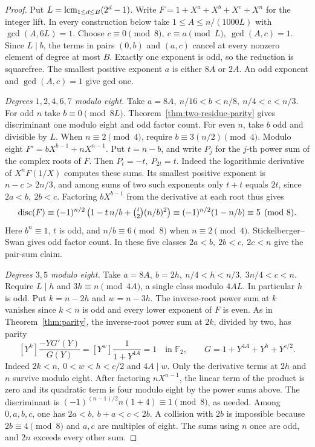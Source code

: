 \documentclass[11pt]{article}
\begin{document}
\begin{proof}
Put \(L=\mathop{\rm lcm}_{1\le d\le B}(2^d-1)\). Write
\(F=1+X^a+X^b+X^c+X^n\) for the integer lift. In every construction
below take \(1\le A\le n/(1000L)\) with \(\gcd(A,6L)=1\).
Choose \(c\equiv0\pmod8,\ c\equiv a\pmod L,\ \gcd(A,c)=1\).
Since \(L\mid b\), the terms in pairs \((0,b)\) and \((a,c)\)
cancel at every nonzero element of degree at most \(B\).
Exactly one exponent is odd, so the reduction is squarefree.
The smallest positive exponent \(a\) is either \(8A\) or \(2A\).
An odd exponent and \(\gcd(A,c)=1\) give gcd one.

\emph{Degrees \(1,2,4,6,7\) modulo eight.}
Take \(a=8A,\ n/16<b<n/8,\ n/4<c<n/3\).
For odd \(n\) take \(b\equiv0\pmod{8L}\). Theorem~\ref{thm:two-residue-parity}
gives discriminant one modulo eight and odd factor count.
For even \(n\), take \(b\) odd and divisible by \(L\).
When \(n\equiv2\pmod4\), require \(b\equiv3(n/2)\pmod4\).
Modulo eight \(F'=bX^{b-1}+nX^{n-1}\). Put \(t=n-b\), and
write \(P_j\) for the \(j\)-th power sum of the complex roots of \(F\).
Then \(P_t=-t,\ P_{2t}=t\). Indeed the logarithmic derivative of
\(X^n F(1/X)\) computes these sums. Its smallest positive exponent
is \(n-c>2n/3\), and among sums of two such exponents only \(t+t\)
equals \(2t\), since \(2a<b,\ 2b<c\).
Factoring \(bX^{b-1}\) from the derivative at each root thus gives
\[
 \operatorname{disc}(F)\equiv (-1)^{n/2}
 \left(1-t\,n/b+\tbinom{t}{2}(n/b)^2\right)
 \equiv (-1)^{n/2}(1-n/b)\equiv5\pmod8 .
\]
Here \(b^n\equiv1\), \(t\) is odd, and \(n/b\equiv6\pmod8\)
when \(n\equiv2\pmod4\). Stickelberger--Swan gives odd factor count.
In these five classes \(2a<b,\ 2b<c,\ 2c<n\) give the pair-sum claim.

\emph{Degrees \(3,5\) modulo eight.}
Take \(a=8A,\ b=2h,\ n/4<h<n/3,\ 3n/4<c<n\).
Require \(L\mid h\) and \(3h\equiv n\pmod{4A}\), a single class
modulo \(4AL\). In particular \(h\) is odd. Put \(k=n-2h\) and
\(w=n-3h\). The inverse-root power sum at \(k\) vanishes since
\(k<n\) is odd and every lower exponent of \(F\) is even. As in
Theorem~\ref{thm:parity}, the inverse-root power sum at \(2k\),
divided by two, has parity
\[
 [Y^k]\frac{-YG'(Y)}{G(Y)}
    =[Y^w]\frac{1}{1+Y^{4A}}=1\quad\text{in }\mathbb F_2,\qquad
 G=1+Y^{4A}+Y^h+Y^{c/2}.
\]
Indeed \(2k<n,\ 0<w<h<c/2\) and \(4A\mid w\).
Only the derivative terms at \(2h\) and \(n\) survive modulo eight.
After factoring \(nX^{n-1}\), the linear term of the product is zero
and its quadratic term is four modulo eight by the power sums above.
The discriminant is \((-1)^{(n-1)/2}n(1+4)\equiv1\pmod8\), as needed.
Among \(0,a,b,c\), one has \(2a<b,\ b+a<c<2b\). A collision with
\(2b\) is impossible because \(2b\equiv4\pmod8\) and \(a,c\) are
multiples of eight. The sums using \(n\) once are odd, and \(2n\)
exceeds every other sum.


\end{proof}
\end{document}

